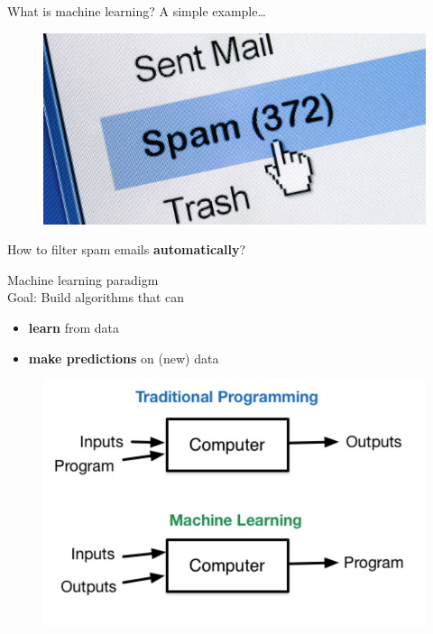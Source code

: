 \documentclass{beamer}
\begin{document}
\begin{frame}{What is machine learning?}
\vfill
A simple example\ldots
\vfill
\begin{figure}
\centering
\includegraphics[width=\textwidth]{images/spam.jpg}
\end{figure}
\vfill
How to filter spam emails \textbf{automatically}?
\vfill
\end{frame}

\begin{frame}{Machine learning paradigm}
~\\
\vfill
Goal: Build algorithms that can 
\begin{itemize}
	\item \textbf{learn} from data
	\item \textbf{make predictions} on (new) data
\end{itemize}
\vfill
\pause
\begin{figure}
\centering
\includegraphics[width=\textwidth]{images/ml_vs_traditional.jpg}
\end{figure}
\vfill
\end{frame}
\end{document}
